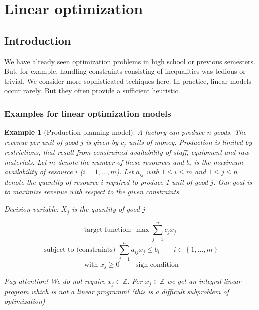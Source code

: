 \documentclass[a4paper]{article}
\numberwithin{lecref}{subsection}
\newcounter{exercises}
\newtheorem{example}[exercises]{Example}
\newcommand{\Set}[1]{\left\{#1\right\}}
\begin{document}
\section{Linear optimization}
\label{chapter:1}
\setcounter{subsection}{-1}
\subsection{Introduction}
\label{section:1.1}

We have already seen optimization problems in high school or previous semesters.
But, for example, handling constraints consisting of inequalities was tedious or trivial.
We consider more sophisticated techiques here.
In practice, linear models occur rarely. But they often provide a sufficient heuristic.

\subsubsection{Examples for linear optimization models}

\begin{example}[Production planning model]
	\label{example:1}
	A factory can produce $n$ goods.
	The revenue per unit of good $j$ is given by $c_j$ units of money.
	Production is limited by restrictions, that result from constrained availability of staff, equipment and raw materials.
	Let $m$ denote the number of these resources and $b_i$ is the maximum availability of resource $i$ ($i = 1, \dots, m$).
	Let $a_{ij}$ with $1 \leq i \leq m$ and $1 \leq j \leq n$ denote the quantity of resource $i$ required to produce 1 unit of good $j$.
	Our goal is to maximize revenue with respect to the given constraints.

	\emph{Decision variable:} $X_j$ is the quantity of good $j$

	\[ \text{target function: } \max \sum_{j=1}^n c_j x_j \]
	\[ \text{ subject to (constraints) } \sum_{j=1}^n a_{ij} x_j \leq b_i \qquad i \in \Set{1, \dots, m} \]
	\[ \text{ with } x_j \geq 0 \qquad \text{ sign condition} \]

	Pay attention! We do not require $x_j \in \mathbb Z$. For $x_j \in \mathbb Z$ we get an integral linear program which is \emph{not} a linear programm! (this is a difficult subproblem of optimization)
\end{example}
\end{document}
